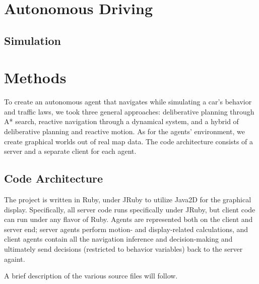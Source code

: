 \documentclass{article}
\begin{document}
\section{Autonomous Driving}

\subsection{Simulation}

\section{Methods}

To create an autonomous agent that navigates while simulating a car's behavior
and traffic laws, we took three general approaches: deliberative planning
through A* search, reactive navigation through a dynamical system, and a hybrid
of deliberative planning and reactive motion. As for the agents' environment, we
create graphical worlds out of real map data. The code architecture consists of
a server and a separate client for each agent.

\subsection{Code Architecture}

The project is written in Ruby, under JRuby to utilize Java2D for the graphical
display. Specifically, all server code runs specifically under JRuby, but client
code can run under any flavor of Ruby. Agents are represented both on the client
and server end; server agents perform motion- and display-related
calculations, and client agents contain all the navigation inference and
decision-making and ultimately send decisions (restricted to behavior variables)
back to the server againt.

A brief description of the various source files will follow.
\end{document}
